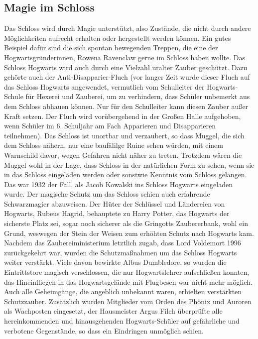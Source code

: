 \documentclass[a4paper, 10pt]{article}
\begin{document}
\subsection*{\Large Magie im Schloss}
Das Schloss wird durch Magie unterstützt, also Zustände, die nicht durch andere Möglichkeiten aufrecht erhalten oder hergestellt werden können. Ein gutes Beispiel dafür sind die sich spontan bewegenden Treppen, die eine der Hogwartsgründerinnen, Rowena Ravenclaw gerne im Schloss haben wollte. Das Schloss Hogwarts wird auch durch eine Vielzahl uralter Zauber geschützt. Dazu gehörte auch der Anti-Disapparier-Fluch (vor langer Zeit wurde dieser Fluch auf das Schloss Hogwarts angewendet, vermutlich vom Schulleiter der Hogwarts-Schule für Hexerei und Zauberei, um zu verhindern, dass Schüler unbemerkt aus dem Schloss abhauen können. Nur für den Schulleiter kann diesen Zauber außer Kraft setzen. Der Fluch wird vorübergehend in der Großen Halle aufgehoben, wenn Schüler im 6. Schuljahr am Fach Apparieren und Disapparieren teilnehmen). Das Schloss ist unortbar und verzaubert, so dass Muggel, die sich dem Schloss nähern, nur eine baufälilge Ruine sehen würden, mit einem Warnschild davor, wegen Gefahren nicht näher zu treten. Trotzdem wären die Muggel wohl in der Lage, dass Schloss in der natürlichen Form zu sehen, wenn sie in das Schloss eingeladen werden oder sonstwie Kenntnis vom Schloss gelangen. Das war 1932 der Fall, als Jacob Kowalski ins Schloss Hogwarts eingeladen wurde. Der magische Schutz um das Schloss schien auch erfahrende Schwarzmagier abzuweisen.
\vspace{10pt}
\newline
{}  
Der Hüter der Schlüssel und Ländereien von Hogwarts, Rubeus Hagrid, behauptete zu Harry Potter, das Hogwarts der sicherste Platz sei, sogar noch sicherer als die Gringotts Zaubererbank, wohl ein Grund, weswegen der Stein der Weisen zum erhöhten Schutz nach Hogwarts kam. Nachdem das Zaubereiministerium letztlich zugab, dass Lord Voldemort 1996 zurückgekehrt war, wurden die Schutzmaßnahmen um das Schloss Hogwarts weiter verstärkt. Viele davon bewirkte Albus Dumbledore, so wurden die Eintrittstore magisch verschlossen, die nur Hogwartslehrer aufschließen konnten, das Hineinfliegen in das Hogwartsgelände mit Flugbesen war nicht mehr möglich. Auch alle Geheimgänge, die angeblich unbekannt waren, erhielten verstärkten Schutzzauber. Zusätzlich wurden Mitglieder vom Orden des Phönix und Auroren als Wachposten eingesetzt, der Hausmeister Argus Filch überprüfte alle hereinkommenden und hinausgehenden Hogwarts-Schüler auf gefährliche und verbotene Gegenstände, so dass ein Eindringen unmöglich schien.
\end{document}
